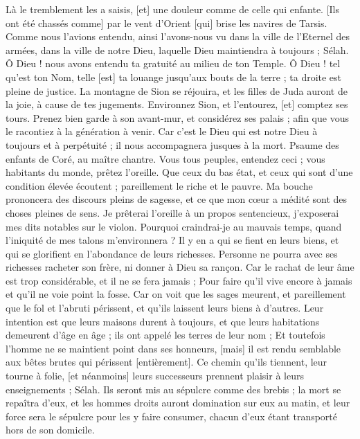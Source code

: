 \begin{multicols}{2}
Là le tremblement les a saisis, [et] une douleur comme de celle qui enfante.
[Ils ont été chassés comme] par le vent d'Orient [qui] brise les navires de Tarsis.
Comme nous l'avions entendu, ainsi l'avons-nous vu dans la ville de l'Eternel des armées, dans la ville de notre Dieu, laquelle Dieu maintiendra à toujours ; Sélah.
Ô Dieu ! nous avons entendu ta gratuité au milieu de ton Temple.
Ô Dieu ! tel qu'est ton Nom, telle [est] ta louange jusqu'aux bouts de la terre ; ta droite est pleine de justice.
La montagne de Sion se réjouira, et les filles de Juda auront de la joie, à cause de tes jugements.
Environnez Sion, et l'entourez, [et] comptez ses tours.
Prenez bien garde à son avant-mur, et considérez ses palais ; afin que vous le racontiez à la génération à venir.
Car c'est le Dieu qui est notre Dieu à toujours et à perpétuité ; il nous accompagnera jusques à la mort.
\VerseOne{}Psaume des enfants de Coré, au maître chantre. Vous tous peuples, entendez ceci ; vous habitants du monde, prêtez l'oreille.
Que ceux du bas état, et ceux qui sont d'une condition élevée écoutent ; pareillement le riche et le pauvre.
Ma bouche prononcera des discours pleins de sagesse, et ce que mon cœur a médité sont des choses pleines de sens.
Je prêterai l'oreille à un propos sentencieux, j'exposerai mes dits notables sur le violon.
Pourquoi craindrai-je au mauvais temps, quand l'iniquité de mes talons m'environnera ?
Il y en a qui se fient en leurs biens, et qui se glorifient en l'abondance de leurs richesses.
Personne ne pourra avec ses richesses racheter son frère, ni donner à Dieu sa rançon.
Car le rachat de leur âme est trop considérable, et il ne se fera jamais ;
Pour faire qu'il vive encore à jamais et qu'il ne voie point la fosse.
Car on voit que les sages meurent, et pareillement que le fol et l'abruti périssent, et qu'ils laissent leurs biens à d'autres.
Leur intention est que leurs maisons durent à toujours, et que leurs habitations demeurent d'âge en âge ; ils ont appelé les terres de leur nom ;
Et toutefois l'homme ne se maintient point dans ses honneurs, [mais] il est rendu semblable aux bêtes brutes qui périssent [entièrement].
Ce chemin qu'ils tiennent, leur tourne à folie, [et néanmoins] leurs successeurs prennent plaisir à leurs enseignements ; Sélah.
Ils seront mis au sépulcre comme des brebis ; la mort se repaîtra d'eux, et les hommes droits auront domination sur eux au matin, et leur force sera le sépulcre pour les y faire consumer, chacun d'eux étant transporté hors de son domicile.

\end{multicols}
